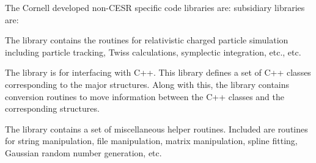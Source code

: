 {{{{{{The Cornell developed non-CESR specific code libraries are:
subsidiary libraries are: 
\begin{description}
  \item[bmad] \Newline
The  library contains the routines for relativistic charged
particle simulation including particle tracking, Twiss calculations,
symplectic integration, etc., etc.
  \item[cpp_bmad_interface]
The  library is for interfacing \bmad with C++.  This library
defines a set of C++ classes corresponding to the major \bmad structures. Along
with this, the library contains conversion routines to move information between 
the C++ classes and the corresponding \bmad structures.
  \item[sim_utils] \Newline
The  library contains a set of miscellaneous helper routines. 
Included are routines for string manipulation, file manipulation,
matrix manipulation, spline fitting, Gaussian random number generation, etc. 
\end{description}

}}}}}}

